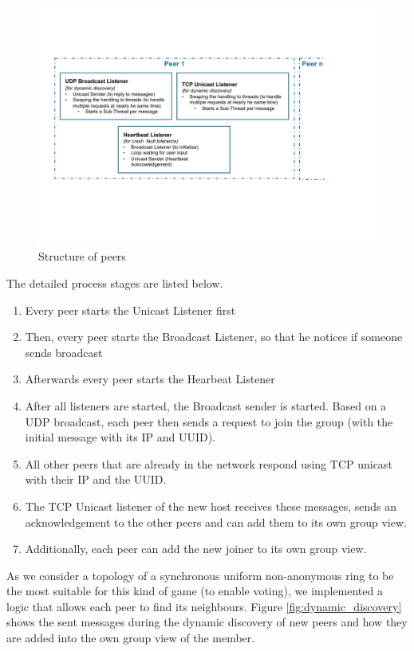 \documentclass[runningheads]{llncs}
\begin{document}
            \begin{figure}[H]
           \includegraphics[width=\textwidth]{peer-structure.pdf}
            \caption{Structure of peers} \label{fig:peer-structure}
        \end{figure}
            
            The detailed process stages are listed below.
            \begin{enumerate}
                \item Every peer starts the Unicast Listener first
                \item Then, every peer starts the Broadcast Listener, so that he notices if someone sends broadcast
                \item Afterwards every peer starts the Hearbeat Listener
                \item After all listeners are started, the Broadcast sender is started. Based on a UDP broadcast, each peer then sends a request to join the group (with the initial message with its IP and UUID).
                \item All other peers that are already in the network respond using TCP unicast with their IP and the UUID.
                \item  The TCP Unicast listener of the new host receives these messages, sends an acknowledgement to the other peers and can add them to its own group view.
                \item  Additionally, each peer can add the new joiner to its own group view. 
             \end{enumerate} 
             As we consider a topology of a synchronous uniform non-anonymous ring to be the most suitable for this kind of game (to enable voting), we implemented a logic that allows each peer to find its neighbours.
            Figure \ref{fig:dynamic_discovery} shows the sent messages during the dynamic discovery of new peers and how they are added into the own group view of the member.
        
\end{document}
